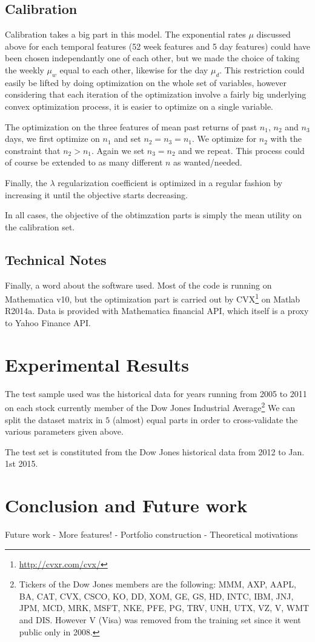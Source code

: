 \documentclass[11pt,fleqn]{article}
\begin{document}
\subsection{Calibration}

Calibration takes a big part in this model. The exponential rates $\mu$ discussed above
for each temporal features (52 week features and 5 day features) could have been chosen
independantly one of each other, but we made the choice of taking the weekly $\mu_w$ equal
to each other, likewise for the day $\mu_d$. This restriction could easily be lifted by
doing optimization on the whole set of variables, however considering that each iteration
of the optimization involve a fairly big underlying convex optimization process, it is
easier to optimize on a single variable.

The optimization on the three features of mean past returns of past $n_1$, $n_2$ and $n_3$
days, we first optimize on $n_1$ and set $n_2=n_3=n_1$. We optimize for $n_2$ with the
constraint that $n_2>n_1$. Again we set $n_3=n_2$ and we repeat. This process could of
course be extended to as many different $n$ as wanted/needed. 

Finally, the $\lambda$ regularization coefficient is optimized in a regular fashion by
increasing it until the objective starts decreasing. 

In all cases, the objective of the obtimzation parts is simply the mean utility on the
calibration set.



\subsection{Technical Notes}

Finally, a word about the software used. Most of the code is running on Mathematica v10,
but the optimization part is carried out by CVX\footnote{\url{http://cvxr.com/cvx/}} on
Matlab R2014a. Data is provided with Mathematica financial API, which itself is a proxy to
Yahoo Finance API. 


\section{Experimental Results}

The test sample used was the historical data for years running from 2005 to 2011 on each
stock currently member of the Dow Jones Industrial Average\footnote{Tickers of the Dow
  Jones members are the following: MMM, AXP, AAPL, BA, CAT, CVX, CSCO, KO, DD, XOM, GE,
  GS, HD, INTC, IBM, JNJ, JPM, MCD, MRK, MSFT, NKE, PFE, PG, TRV, UNH, UTX, VZ, V, WMT and
  DIS.  However V (Visa) was removed from the training set since it went public only in
  2008.} We can split the dataset matrix in $5$ (almost) equal parts in order to
cross-validate the various parameters given above. 

The test set is constituted from the Dow Jones historical data from 2012 to Jan. 1st
2015. 

\section{Conclusion and Future work}

Future work
 - More features!
 - Portfolio construction
 - Theoretical motivations
\end{document}
